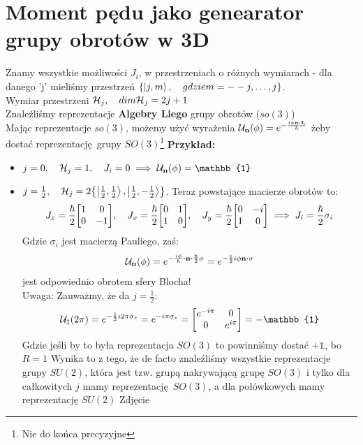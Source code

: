 \documentclass[12pt,a4paper]{report}
\newcommand{\subind}[2]{{\color{blue} #1\index{#2}}}
\newcommand{\com}[1]{{\color{red} #1}}
\newcommand{\uwaga}[1]{{\color{violet} Uwaga:} #1}
\newcommand{\Id}{\mathbb{1}}
\renewcommand{\emph}{\textbf}
\newenvironment{lecture}[1]{\par\medskip
   \noindent\chapter{#1} \rmfamily}{\medskip}
\begin{document}
\begin{lecture}{Moment pędu jako genearator grupy obrotów w 3D}
    {\color{Orchid}
    Znamy wszystkie możliwości $J_i$, w przestrzeniach o różnych wymiarach - dla danego 'j' mieliśmy przestrzeń $\qty{\ket{j,m}\qc{gdzie } m = --j,\dots, j}$.\\
    Wymiar przestrzeni $\mathcal{H}_j \qc dim\mathcal{H}_j = 2j + 1$\\
    Znaleźliśmy reprezentacje \emph{Algebry Liego} grupy obrotów ($so(3)$)\\
    Mając reprezentacje $so(3)$, możemy użyć wyrażenia $\mathcal{U}_{\vb{n}}(\phi) = e^{- \frac{i \phi \vb{n}\vdot\vb{L}}{\hbar}}$ żeby dostać reprezentację grupy $SO(3)$\footnote{Nie do końca precyzyjne}
    }
    \emph{Przykład:}\\
    \begin{itemize}
        \item $j = 0 \qc \mathcal{H}_j = 1 \qc J_i = 0 \implies \mathcal{U}_{\vb{n}}(\phi) = \Id$
        \item $j = \frac12 \qc \mathcal{H}_j = 2 \qty{\ket{\frac12, \frac12}, \ket{\frac12, -\frac12}}$. Teraz powstające macierze obrotów to:
        \[
            J_z = \frac{\hbar}{2}\mqty[1 & 0 \\ 0 & -1] \qc J_x = \frac{\hbar}{2}\mqty[0 & 1 \\ 1 & 0] \qc J_y = \frac{\hbar}{2}\mqty[0 & -i \\ 1 & 0] \implies J_i = \frac{\hbar}{2} \sigma_i
        \]
        Gdzie $\sigma_i$ jest \subind{macierzą Pauliego}{Macierz Pauliego}, zaś:
        \[
            \mathcal{U}_{\vb{n}}(\phi) = e^{- \frac{i \phi}{\hbar} \vdot \vb{n} \vdot \frac{\hbar}{2} \vb{\sigma}} = e^{-\frac12i \phi \vb{n} \vdot \vb{\sigma}}
        \]
        jest odpowiednio obrotem sfery Blocha!\\
        \uwaga Zauważmy, że da $j = \frac12$:\\
        \[
            \mathcal{U_z}(2\pi) = e^{-\frac12 i 2 \pi \sigma_z} = e^{-i\pi \sigma_z} = \mqty[e^{-i \pi} & 0 \\ 0 & e^{i \pi}] = - \Id
        \]
        Gdzie jeśli by to była reprezentacja $SO(3)$ to powinniśmy dostać $+\Id$, bo $R = 1$
        Wynika to z tego, że de facto znaleźliśmy wszystkie reprezentacje grupy $SU(2)$, która jest tzw. grupą nakrywającą grupę $SO(3)$ i tylko dla całkowitych $j$ mamy reprezentację $SO(3)$, a dla połówkowych mamy reprezentację $SU(2)$
        \com{Zdjęcie}
    \end{itemize}

\end{lecture}
\end{document}
